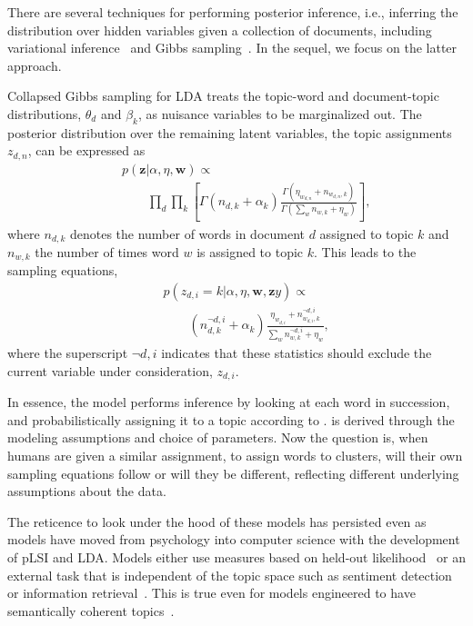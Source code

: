 There are several techniques for performing posterior inference,
i.e., inferring the distribution over hidden variables given a
collection of documents, including variational
inference~\cite{blei-03} and Gibbs sampling~\cite{griffiths-06}.  In
the sequel, we focus on the latter approach.  

Collapsed Gibbs sampling for LDA treats the topic-word and
document-topic distributions, $\theta_d$ and $\beta_k$, as nuisance
variables to be marginalized out. The posterior distribution over the
remaining latent variables, the topic assignments $z_{d,n}$, can be
expressed as
\begin{eqnarray*}
  &&p(\bm{z} | \alpha, \eta, \bm{w}) \propto \\
  &&\qquad \prod_{d}\prod_{k} \left[ \Gamma(n_{d,k} + \alpha_{k})\frac{\Gamma(\eta_{w_{d,n}} + n_{w_{d,n}, k})}{\Gamma(\sum_w n_{w, k} + \eta_w)}\right],
\end{eqnarray*}
where $n_{d,k}$ denotes the number of words in document $d$ assigned
to topic $k$ and $n_{w,k}$ the number of times word $w$ is assigned to
topic $k$.  This leads to the sampling equations,
\begin{eqnarray}
  &&p(z_{d,i} = k | \alpha, \eta, \bm{w}, \bm{z}y) \propto \\
  &&\qquad (n^{\lnot d,i}_{d,k} + \alpha_{k})\frac{\eta_{w_{d,i}} + n^{\lnot d,i}_{w_{d,i}, k}}{\sum_w n^{\lnot d,i}_{w, k} + \eta_w},
  \label{eq:sampling}
\end{eqnarray}
where the superscript $\lnot d,i$ indicates that these statistics
should exclude the current variable under consideration, $z_{d,i}$.

In essence, the model performs inference by looking at each word in
succession, and probabilistically assigning it to a topic according to
.   is derived through the
modeling assumptions and choice of parameters.  Now the question is,
when humans are given a similar assignment, to assign words to
clusters, will their own sampling equations follow 
or will they be different, reflecting different underlying assumptions
about the data.


The reticence to look under the hood of these models has persisted
even as models have moved from psychology into computer science with
the development of pLSI and LDA.  Models either use measures based on
held-out likelihood~\cite{blei-03,blei-06} or an external task that is
independent of the topic space such as sentiment
detection~\cite{titov-08} or information retrieval~\cite{wei-06}.
This is true even for models engineered to have semantically coherent
topics~\cite{boyd-graber-07}.

